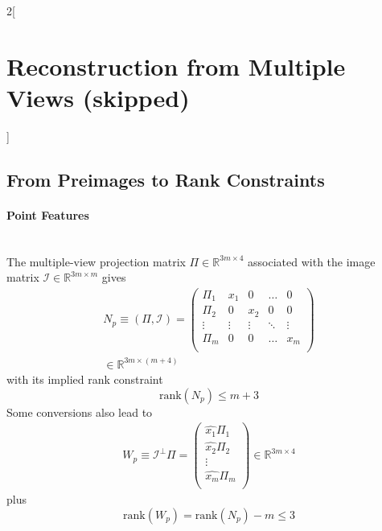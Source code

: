 \documentclass[oneside,fontsize=11pt,paper=a4]{scrartcl}
\begin{document}
\begin{multicols}{2}[\section{Reconstruction from Multiple Views (skipped)}]
\subsection{From Preimages to Rank Constraints}

\paragraph{Point Features} \mbox{}\\
The multiple-view projection matrix $\Pi \in \mathbb{R}^{3m \times 4}$ associated with the image matrix $\mathcal{I} \in \mathbb{R}^{3m \times m}$ gives
\begin{equation*}
\begin{split}
    N_p \equiv (\Pi, \mathcal{I}) = \begin{pmatrix} \Pi_1 & x_1 & 0 & \dots & 0\\ \Pi_2 & 0 & x_2 & 0 &  0\\ \vdots & \vdots & \vdots & \ddots & \vdots\\ \Pi_m & 0 & 0 & \dots & x_m\\\end{pmatrix} \\ \in \mathbb{R}^{3m \times (m+4)}
\end{split}
\end{equation*}
with its implied rank constraint
\begin{equation*}
    \text{rank}(N_p) \leq m + 3
\end{equation*}
Some conversions also lead to
\begin{equation*}
\begin{split}
    W_p \equiv \mathcal{I}^{\perp} \Pi = \begin{pmatrix} \hat{x_1} \Pi_1 \\ \hat{x_2} \Pi_2 \\ \vdots \\ \hat{x_m} \Pi_m \\\end{pmatrix} \in \mathbb{R}^{3m \times 4}
\end{split}
\end{equation*}
plus 
\begin{equation*}
    \text{rank}(W_p) = \text{rank}(N_p) - m \leq 3
\end{equation*}

\end{multicols}
\end{document}
